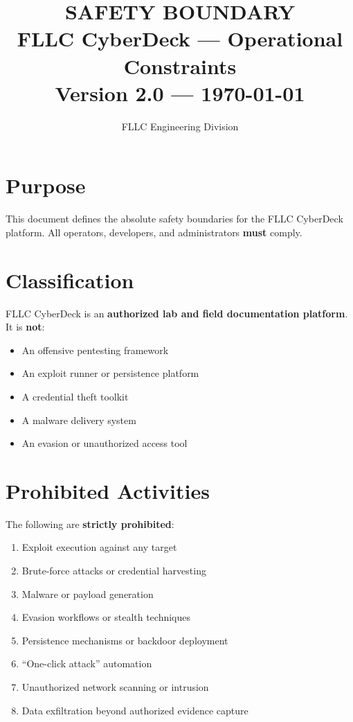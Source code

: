 \documentclass[11pt,a4paper]{article}
\title{%
  {\Huge\bfseries\textcolor{warn}{SAFETY BOUNDARY}}\\[6pt]
  {\Large FLLC CyberDeck --- Operational Constraints}\\[4pt]
  {\normalsize Version 2.0 --- \today}
}
\author{FLLC Engineering Division}
\date{}
\begin{document}
\maketitle\thispagestyle{fancy}
\tableofcontents\newpage

\section{Purpose}
This document defines the absolute safety boundaries for the FLLC CyberDeck
platform. All operators, developers, and administrators \textbf{must} comply.

\section{Classification}
FLLC CyberDeck is an \textbf{authorized lab and field documentation platform}.
It is \textbf{not}:
\begin{itemize}[label=\textcolor{warn}{\textbullet}]
  \item An offensive pentesting framework
  \item An exploit runner or persistence platform
  \item A credential theft toolkit
  \item A malware delivery system
  \item An evasion or unauthorized access tool
\end{itemize}

\section{Prohibited Activities}
The following are \textbf{strictly prohibited}:
\begin{enumerate}[label=\textcolor{warn}{\arabic*.}]
  \item Exploit execution against any target
  \item Brute-force attacks or credential harvesting
  \item Malware or payload generation
  \item Evasion workflows or stealth techniques
  \item Persistence mechanisms or backdoor deployment
  \item ``One-click attack'' automation
  \item Unauthorized network scanning or intrusion
  \item Data exfiltration beyond authorized evidence capture
\end{enumerate}
\end{document}
